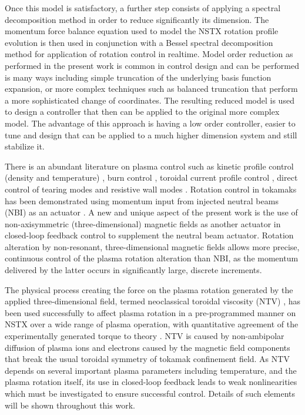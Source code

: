\documentclass[12pt]{iopart}
\begin{document}
Once this model is satisfactory, a further step consists of applying a spectral decomposition method in order to reduce significantly its dimension. The momentum force balance equation used to model the NSTX rotation profile evolution is then used in conjunction with a Bessel spectral decomposition method for application of rotation control in realtime. Model order reduction as performed in the present work is common in control design and can be performed is many ways including simple truncation of the underlying basis function expansion, or more complex techniques such as balanced truncation \cite{Moore81} that perform a more sophisticated change of coordinates. The resulting reduced model is used to design a controller that then can be applied to the original more complex model. The advantage of this approach is having a low order controller, easier to tune and design that can be applied to a much higher dimension system and still stabilize it.
 
There is an abundant literature on plasma control such as kinetic profile control (density and temperature) \cite{Schuster02, Boyer11}, burn control \cite{Schuster01, Schuster02-2, Schuster02-3, Vitela98, Boyer12}, toroidal current profile control \cite{Boyer133, Boyer144, Barton12, Ou09, Ebrahimi04}, direct control of tearing modes \cite{Welander13, Volpe09} and resistive wall modes \cite{Sabbagh06,Sabbagh13}. Rotation control in tokamaks has been demonstrated using momentum input from injected neutral beams (NBI) as an actuator \cite{Scoville07}.  A new and unique aspect of the present work is the use of non-axisymmetric (three-dimensional) magnetic fields as another actuator in closed-loop feedback control to supplement the neutral beam actuator. Rotation alteration by non-resonant, three-dimensional magnetic fields allows more precise, continuous control of the plasma rotation alteration than NBI, as the momentum delivered by the latter occurs in significantly large, discrete increments.

The physical process creating the force on the plasma rotation generated by the applied three-dimensional field, termed neoclassical toroidal viscosity (NTV) \cite{Shaing88, Shaing10}, has been used successfully to affect plasma rotation in a pre-programmed manner on NSTX over a wide range of plasma operation, with quantitative agreement of the experimentally generated torque to theory \cite{Zhu06}. NTV is caused by non-ambipolar diffusion of plasma ions and electrons caused by the magnetic field components that break the usual toroidal symmetry of tokamak confinement field. As NTV depends on several important plasma parameters including temperature, and the plasma rotation itself, its use in closed-loop feedback leads to weak nonlinearities which must be investigated to ensure successful control. Details of such elements will be shown throughout this work. 
\end{document}
